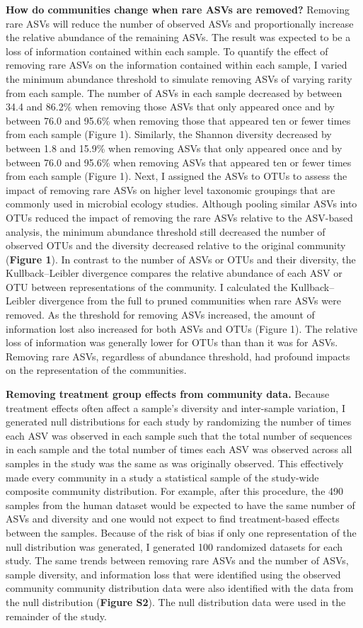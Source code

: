 \documentclass[]{article}
\begin{document}
\textbf{How do communities change when rare ASVs are removed?} Removing
rare ASVs will reduce the number of observed ASVs and proportionally
increase the relative abundance of the remaining ASVs. The result was
expected to be a loss of information contained within each sample. To
quantify the effect of removing rare ASVs on the information contained
within each sample, I varied the minimum abundance threshold to simulate
removing ASVs of varying rarity from each sample. The number of ASVs in
each sample decreased by between 34.4 and 86.2\% when removing those
ASVs that only appeared once and by between 76.0 and 95.6\% when
removing those that appeared ten or fewer times from each sample (Figure
1). Similarly, the Shannon diversity decreased by between 1.8 and 15.9\%
when removing ASVs that only appeared once and by between 76.0 and
95.6\% when removing ASVs that appeared ten or fewer times from each
sample (Figure 1). Next, I assigned the ASVs to OTUs to assess the
impact of removing rare ASVs on higher level taxonomic groupings that
are commonly used in microbial ecology studies. Although pooling similar
ASVs into OTUs reduced the impact of removing the rare ASVs relative to
the ASV-based analysis, the minimum abundance threshold still decreased
the number of observed OTUs and the diversity decreased relative to the
original community (\textbf{Figure 1}). In contrast to the number of
ASVs or OTUs and their diversity, the Kullback--Leibler divergence
compares the relative abundance of each ASV or OTU between
representations of the community. I calculated the Kullback--Leibler
divergence from the full to pruned communities when rare ASVs were
removed. As the threshold for removing ASVs increased, the amount of
information lost also increased for both ASVs and OTUs (Figure 1). The
relative loss of information was generally lower for OTUs than than it
was for ASVs. Removing rare ASVs, regardless of abundance threshold, had
profound impacts on the representation of the communities.

\textbf{Removing treatment group effects from community data.} Because
treatment effects often affect a sample's diversity and inter-sample
variation, I generated null distributions for each study by randomizing
the number of times each ASV was observed in each sample such that the
total number of sequences in each sample and the total number of times
each ASV was observed across all samples in the study was the same as
was originally observed. This effectively made every community in a
study a statistical sample of the study-wide composite community
distribution. For example, after this procedure, the 490 samples from
the human dataset would be expected to have the same number of ASVs and
diversity and one would not expect to find treatment-based effects
between the samples. Because of the risk of bias if only one
representation of the null distribution was generated, I generated 100
randomized datasets for each study. The same trends between removing
rare ASVs and the number of ASVs, sample diversity, and information loss
that were identified using the observed community community distribution
data were also identified with the data from the null distribution
(\textbf{Figure S2}). The null distribution data were used in the
remainder of the study.
\end{document}
